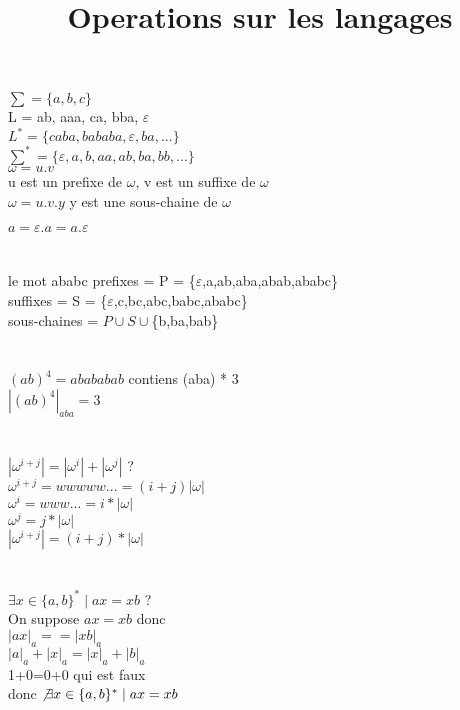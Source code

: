 \documentclass{article}
\title{Operations sur les langages}
\begin{document}
\maketitle

$\sum = \{a,b,c\} $ \\ 
L = ab, aaa, ca, bba, $\varepsilon$\\
$L^* = \{caba, bababa, \varepsilon, ba,...\} $\\

$\sum^* = \{\varepsilon, a,b,aa,ab,ba,bb,...\} $\\

$\omega =  u.v$\\
u est un prefixe de $\omega$, v est un suffixe de $\omega$\\
$\omega =  u.v.y$ y est une sous-chaine de $\omega$

$ a = \varepsilon.a = a.\varepsilon $\\



\section{ }
le mot ababc
prefixes = P = \{$\varepsilon$,a,ab,aba,abab,ababc\} \\
suffixes = S = \{$\varepsilon$,c,bc,abc,babc,ababc\} \\
sous-chaines = $P \cup S \cup$\{b,ba,bab\}


\section{ }
$(ab)^4 = abababab$ contiens (aba) * 3\\
$|(ab)^4|_{aba} = 3$


\section{ }
$|\omega^{i+j}| = |\omega^{i}|+|\omega^{j}|$ ?\\
$\omega^{i+j} = wwwww... =(i+j)|\omega|$\\
$\omega^{i} = www... =i*|\omega|$\\
$\omega^{j} =j*|\omega|$\\
$|\omega^{i+j}| = (i+j)*|\omega|$

\section{ }
$\exists x \in \{a,b\}^* \mid ax=xb $ ?\\
On suppose $ax=xb$ donc\\ 
$|ax|_a == |xb|_a$\\
$|a|_a + |x|_a = |x|_a + |b|_a  $\\
1+0=0+0 qui est faux \\
donc $\not\exists x \in \{a,b\}^* \mid ax=xb $
\end{document}
